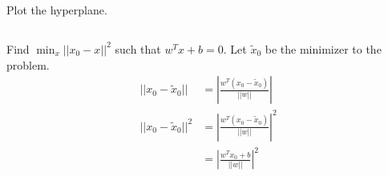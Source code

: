 Plot the hyperplane. \\

\subsection{}

Find $\min_{x} ||x_0 - x||^2$ such that $w^T x + b = 0$. Let $\tilde{x}_0$ be the minimizer to the problem.  
\begin{align*}
    ||x_0 - \tilde{x}_0|| &= |\frac{w^T (x_0 - \tilde{x}_0)}{||w||}| \\
    ||x_0 - \tilde{x}_0||^2 &= |\frac{w^T (x_0 - \tilde{x}_0)}{||w||}|^2 \\ 
    &= |\frac{w^T x_0 + b}{||w||}|^2
\end{align*}

